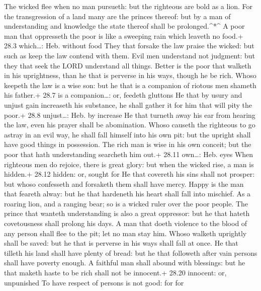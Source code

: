  The wicked flee when no man pursueth: but the righteous are
bold as a lion.  For the transgression of a land many are
the princes thereof: but by a man of understanding and knowledge the
state thereof shall be prolonged.\^{}*\^{}  A poor man that
oppresseth the poor is like a sweeping rain which leaveth no food.+ 28.3
which\ldots: Heb. without food  They that forsake the law
praise the wicked: but such as keep the law contend with them.
 Evil men understand not judgment: but they that seek the
LORD understand all things.  Better is the poor that walketh
in his uprightness, than he that is perverse in his ways, though he be
rich.  Whoso keepeth the law is a wise son: but he that is a
companion of riotous men shameth his father.+ 28.7 is a companion\ldots:
or, feedeth gluttons  He that by usury and unjust gain
increaseth his substance, he shall gather it for him that will pity the
poor.+ 28.8 unjust\ldots: Heb. by increase  He that turneth
away his ear from hearing the law, even his prayer shall be abomination.
 Whoso causeth the righteous to go astray in an evil way,
he shall fall himself into his own pit: but the upright shall have good
things in possession.  The rich man is wise in his own
conceit; but the poor that hath understanding searcheth him out.+ 28.11
own\ldots: Heb. eyes  When righteous men do rejoice, there
is great glory: but when the wicked rise, a man is hidden.+ 28.12
hidden: or, sought for  He that covereth his sins shall not
prosper: but whoso confesseth and forsaketh them shall have mercy.
 Happy is the man that feareth alway: but he that hardeneth
his heart shall fall into mischief.  As a roaring lion, and
a ranging bear; so is a wicked ruler over the poor people. 
The prince that wanteth understanding is also a great oppressor: but he
that hateth covetousness shall prolong his days.  A man
that doeth violence to the blood of any person shall flee to the pit;
let no man stay him.  Whoso walketh uprightly shall be
saved: but he that is perverse in his ways shall fall at once.
 He that tilleth his land shall have plenty of bread: but
he that followeth after vain persons shall have poverty enough.
 A faithful man shall abound with blessings: but he that
maketh haste to be rich shall not be innocent.+ 28.20 innocent: or,
unpunished  To have respect of persons is not good: for for
